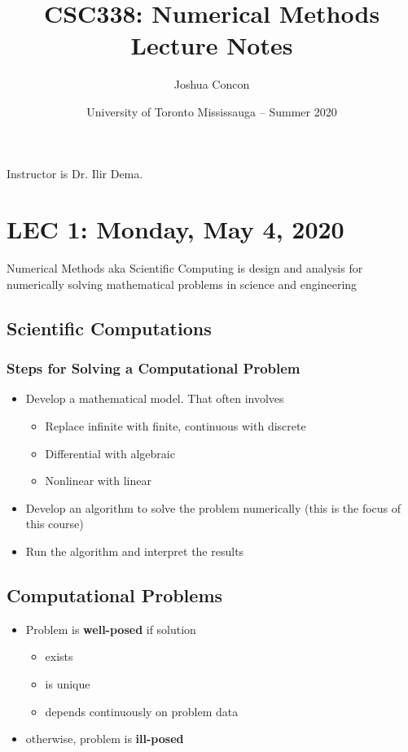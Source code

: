 \documentclass[12pt]{article}
\begin{document}
\title{CSC338: Numerical Methods\\ Lecture Notes}
\date{University of Toronto Mississauga -- Summer 2020}
\author{Joshua Concon}
\maketitle
Instructor is Dr. Ilir Dema.

\tableofcontents

\pagebreak

\section{LEC 1: Monday, May 4, 2020}

Numerical Methods aka Scientific Computing is design and analysis for numerically solving mathematical problems in science and engineering

\subsection{Scientific Computations}

\subsubsection{Steps for Solving a Computational Problem}

\begin{itemize}
    \item Develop a mathematical model. That often involves
    \begin{itemize}
        \item Replace infinite with finite, continuous with discrete
        \item Differential with algebraic
        \item Nonlinear with linear
    \end{itemize}
    \item Develop an algorithm to solve the problem numerically (this is the focus of this course)
    \item Run the algorithm and interpret the results
\end{itemize}

\subsection{Computational Problems}

\begin{itemize}
    \item Problem is \textbf{well-posed} if solution
    \begin{itemize}
        \item exists
        \item is unique
        \item depends continuously on problem data
    \end{itemize}
    \item otherwise, problem is \textbf{ill-posed}
\end{itemize}
\end{document}
